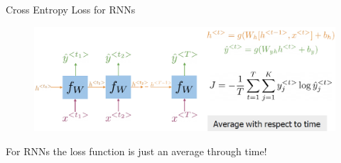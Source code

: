 \begin{frame}{Cross Entropy Loss for RNNs}
    \begin{figure}
        \centering
        \includegraphics[width=\linewidth, height=0.9\textheight,keepaspectratio]{images/nlp/rnn-cross-entropy-loss.png}
    \end{figure}
    For RNNs the loss function is just an average through time!
\end{frame}